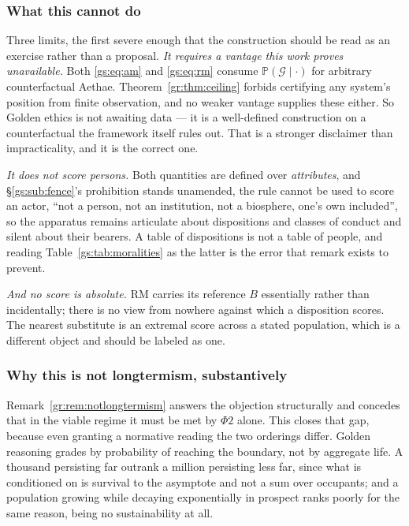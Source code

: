 \documentclass[11pt]{article}
\numberwithin{equation}{section}
\theoremstyle{plain}
\theoremstyle{definition}
\theoremstyle{remark}
\newcommand{\PP}{\mathbb{P}}
\begin{document}
\subsubsection{What this cannot do}\label{gs:ssub:limits}

Three limits, the first severe enough that the construction should be
read as an exercise rather than a proposal. \emph{It requires a vantage this work proves unavailable.} Both
\eqref{gs:eq:am} and \eqref{gs:eq:rm} consume
$\PP(\mathcal G\mid\cdot)$ for arbitrary counterfactual Aethae.
Theorem~\ref{gr:thm:ceiling} forbids certifying any system's position
from finite observation, and no weaker vantage supplies these either. So
Golden ethics is not awaiting data --- it is a well-defined construction
on a counterfactual the framework itself rules out. That is a stronger
disclaimer than impracticality, and it is the correct one.

\emph{It does not score persons.} Both quantities are defined over
\emph{attributes}, and \S\ref{gs:sub:fence}'s prohibition stands
unamended, the rule cannot be used to score an actor, ``not a person,
not an institution, not a biosphere, one's own included'', so the
apparatus remains articulate about dispositions and classes of conduct
and silent about their bearers. A table of dispositions
is not a table of people, and reading
Table~\ref{gs:tab:moralities} as the latter is the error that remark
exists to prevent.

\emph{And no score is absolute.} $\mathrm{RM}$ carries its reference $B$
essentially rather than incidentally; there is no view from nowhere
against which a disposition scores. The nearest substitute is an extremal
score across a stated population, which is a different object and should
be labeled as one.

\subsubsection{Why this is not longtermism, substantively}
\label{gs:ssub:notlongtermism2}

Remark~\ref{gr:rem:notlongtermism} answers the objection structurally and
concedes that in the viable regime it must be met by $\Phi2$ alone. This
closes that gap, because even granting a normative reading the two
orderings differ. Golden reasoning grades by probability of reaching the boundary, not by
aggregate life. A thousand persisting far outrank a million persisting
less far, since what is conditioned on is survival to the asymptote and
not a sum over occupants; and a population growing while decaying
exponentially in prospect ranks poorly for the same reason, being no
sustainability at all.
\end{document}
